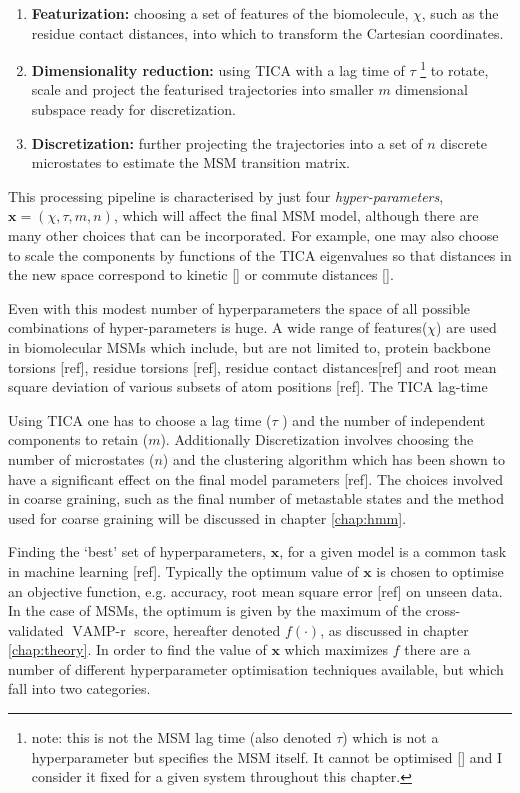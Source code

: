 \begin{enumerate}
    \item \textbf{Featurization:} choosing a set of features of the biomolecule, $\chi$, such as the residue contact distances, into which to transform the Cartesian coordinates.  
    \item \textbf{Dimensionality reduction:} using  TICA with a lag time of $\tau$ \footnote{note: this is not the MSM lag time (also denoted $\tau$) which is not a hyperparameter but specifies the MSM itself. It cannot be optimised [] and I consider it fixed for a given system throughout this chapter.} to rotate, scale and project the featurised trajectories into smaller $m$ dimensional subspace ready for discretization.  
    \item \textbf{Discretization:} further projecting the trajectories into a set of $n$ discrete microstates to estimate the MSM transition matrix. 
\end{enumerate}
This processing pipeline is characterised by just four \emph{hyper-parameters}, $\mathbf{x} = (\chi, \tau, m, n)$, which will affect the final MSM model, although there are many other choices that can be incorporated. For example, one may also choose to scale the components by functions of the TICA eigenvalues so that distances in the new space correspond to kinetic [] or commute distances []. 

Even with this modest number of hyperparameters the space of all possible combinations of hyper-parameters is huge. A wide range of features($\chi$) are used in biomolecular MSMs which include, but are not limited to, protein backbone torsions [ref], residue torsions [ref], residue contact distances[ref] and root mean square deviation of various subsets of atom positions [ref]. The TICA lag-time


Using TICA one has to choose a lag time ($\tau$ ) and the number of independent components to retain ($m$). Additionally  Discretization involves choosing the number of microstates ($n$) and the clustering algorithm which has been shown to have a significant effect on the final model parameters [ref].  The choices involved in coarse graining, such as the final number of metastable states and the method used for coarse graining will be discussed in chapter \ref{chap:hmm}. 

Finding the `best' set of hyperparameters, $\mathbf{x}$, for a given model is a common task in machine learning [ref]. Typically the optimum value of $\mathbf{x}$ is chosen to optimise an objective function, e.g. accuracy, root mean square error [ref] on unseen data. In the case of MSMs, the optimum is given by the maximum of the cross-validated $\operatorname{VAMP-r}$ score, hereafter denoted $f(\cdot)$, as discussed in chapter \ref{chap:theory}. In order to find the value of $\mathbf{x}$ which maximizes $f$ there are a number of different hyperparameter optimisation techniques available, but which fall into two categories. 

